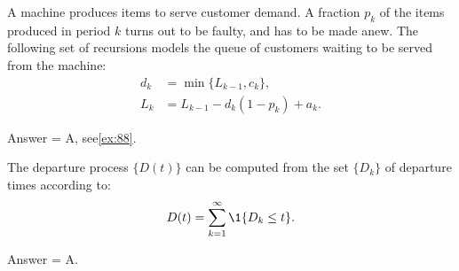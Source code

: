 \begin{exercise}[201907]
  A machine produces items to serve customer demand.
  A fraction $p_k$ of the items produced in period $k$ turns out to be faulty, and has to be made anew.
  The following set of recursions models the queue of customers waiting to be served from the machine:
  \begin{align*}
    d_k &= \min\{L_{k-1}, c_k\}, \\
    L_k &= L_{k-1}-d_k(1-p_k) + a_k.
  \end{align*}
\begin{solution}
Answer =  A, see\cref{ex:88}.
\end{solution}
\end{exercise}

\begin{exercise}[201907]
The departure process $\{D(t)\}$ can be computed from the set $\{D_k\}$ of departure times according to:
\begin{equation*}
  D(t) = \sum_{k=1}^\infty \1{D_k \leq t}.
\end{equation*}

\begin{solution}
Answer =  A.
\end{solution}
\end{exercise}

